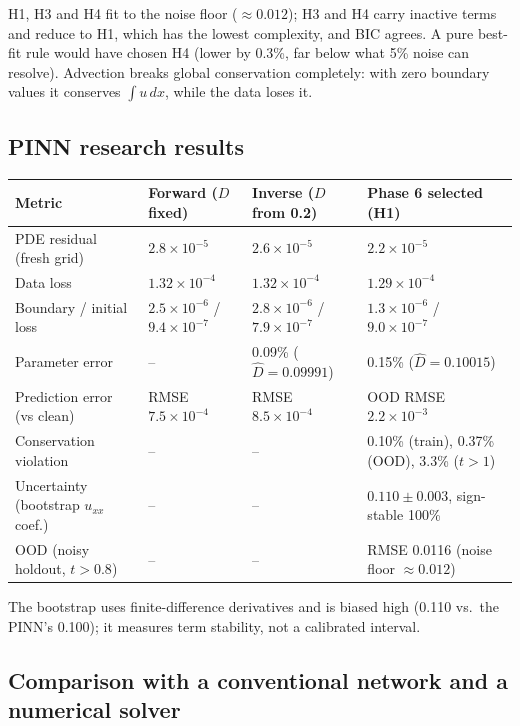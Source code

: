 \documentclass[11pt,a4paper]{article}
\begin{document}
H1, H3 and H4 fit to the noise floor ($\approx0.012$); H3 and H4 carry inactive terms and reduce to H1, which has the
lowest complexity, and BIC agrees. A pure best-fit rule would have chosen H4 (lower by 0.3\%, far below what 5\% noise can resolve). Advection breaks global
conservation completely: with zero boundary values it conserves $\int u\,dx$, while the data loses it.

\subsection{PINN research results}

\begin{center}
\footnotesize
\begin{tabular}{@{}L{3.6cm}L{3.3cm}L{3.3cm}L{5.0cm}@{}}
\toprule
\textbf{Metric} & \textbf{Forward ($D$ fixed)} & \textbf{Inverse ($D$ from 0.2)} & \textbf{Phase 6 selected (H1)} \\ \midrule
PDE residual (fresh grid) & $2.8\times10^{-5}$ & $2.6\times10^{-5}$ & $2.2\times10^{-5}$ \\
Data loss & $1.32\times10^{-4}$ & $1.32\times10^{-4}$ & $1.29\times10^{-4}$ \\
Boundary / initial loss & $2.5\times10^{-6}$ / $9.4\times10^{-7}$ & $2.8\times10^{-6}$ / $7.9\times10^{-7}$ & $1.3\times10^{-6}$ / $9.0\times10^{-7}$ \\
Parameter error & -- & 0.09\% ($\hat D=0.09991$) & 0.15\% ($\hat D=0.10015$) \\
Prediction error (vs clean) & RMSE $7.5\times10^{-4}$ & RMSE $8.5\times10^{-4}$ & OOD RMSE $2.2\times10^{-3}$ \\
Conservation violation & -- & -- & 0.10\% (train), 0.37\% (OOD), 3.3\% ($t>1$) \\
Uncertainty (bootstrap $u_{xx}$ coef.) & -- & -- & $0.110\pm0.003$, sign-stable 100\% \\
OOD (noisy holdout, $t>0.8$) & -- & -- & RMSE 0.0116 (noise floor $\approx0.012$) \\
\bottomrule
\end{tabular}
\end{center}
The bootstrap uses finite-difference derivatives and is biased high (0.110 vs.\ the PINN's 0.100); it measures term
stability, not a calibrated interval.

\subsection{Comparison with a conventional network and a numerical solver}
\end{document}
